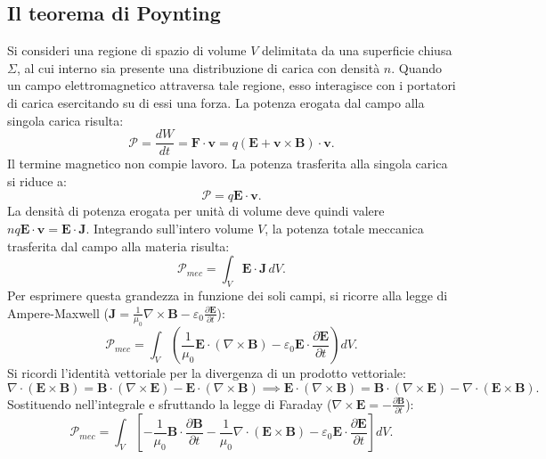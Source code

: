 \documentclass[a4paper,11pt]{report}
\begin{document}
\subsection{Il teorema di Poynting}
Si consideri una regione di spazio di volume $V$ delimitata da una superficie chiusa $\Sigma$, al cui interno sia presente una distribuzione di carica con densità $n$. Quando un campo elettromagnetico attraversa tale regione, esso interagisce con i portatori di carica esercitando su di essi una forza.
La potenza erogata dal campo alla singola carica risulta:
\begin{equation}
\mathcal{P} = \frac{dW}{dt} = \bm{F} \cdot \bm{v} = q(\bm{E} + \bm{v} \times \bm{B}) \cdot \bm{v}.
\end{equation}
Il termine magnetico non compie lavoro. La potenza trasferita alla singola carica si riduce a:
\begin{equation}
\mathcal{P} = q\bm{E} \cdot \bm{v}.
\end{equation}
La densità di potenza erogata per unità di volume deve quindi valere $n q\bm{E} \cdot \bm{v} = \bm{E} \cdot \bm{J}$. Integrando sull'intero volume $V$, la potenza totale meccanica trasferita dal campo alla materia risulta:
\begin{equation}
\mathcal{P}_{mec} = \int_V \bm{E} \cdot \bm{J} \, dV.
\label{eq:potenza_joule}
\end{equation}
Per esprimere questa grandezza in funzione dei soli campi, si ricorre alla legge di Ampere-Maxwell ($\bm{J} = \frac{1}{\mu_0}\nabla \times \bm{B} - \varepsilon_0 \frac{\partial \bm{E}}{\partial t}$):
\begin{equation}
\mathcal{P}_{mec} = \int_V \left( \frac{1}{\mu_0} \bm{E} \cdot (\nabla \times \bm{B}) - \varepsilon_0 \bm{E} \cdot \frac{\partial \bm{E}}{\partial t} \right) dV.
\end{equation}
Si ricordi l'identità vettoriale per la divergenza di un prodotto vettoriale:
\begin{equation}
\nabla \cdot (\bm{E} \times \bm{B}) = \bm{B} \cdot (\nabla \times \bm{E}) - \bm{E} \cdot (\nabla \times \bm{B}) \implies \bm{E} \cdot (\nabla \times \bm{B}) = \bm{B} \cdot (\nabla \times \bm{E}) - \nabla \cdot (\bm{E} \times \bm{B}).
\end{equation}
Sostituendo nell'integrale e sfruttando la legge di Faraday ($\nabla \times \bm{E} = -\frac{\partial \bm{B}}{\partial t}$):
\begin{equation}
\mathcal{P}_{mec} = \int_V \left[ -\frac{1}{\mu_0} \bm{B} \cdot \frac{\partial \bm{B}}{\partial t} - \frac{1}{\mu_0} \nabla \cdot (\bm{E} \times \bm{B}) - \varepsilon_0 \bm{E} \cdot \frac{\partial \bm{E}}{\partial t} \right] dV.
\end{equation}
\end{document}
